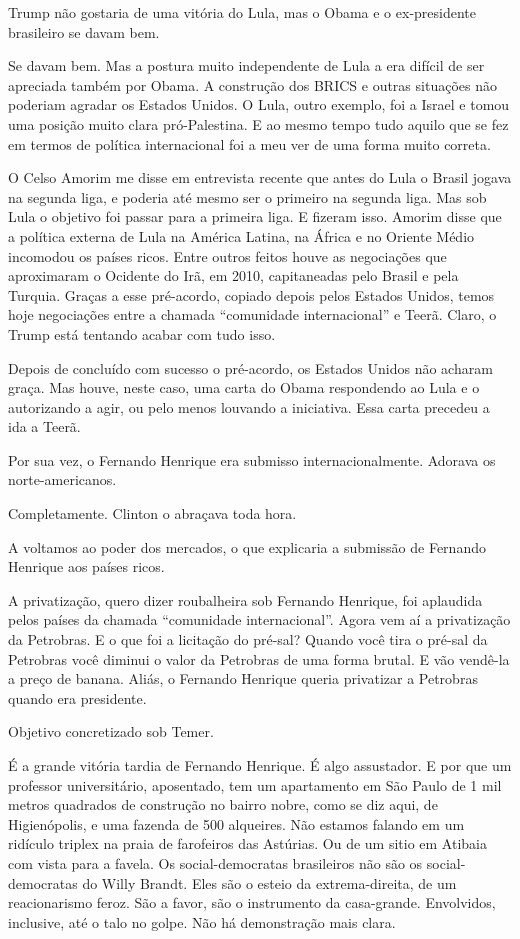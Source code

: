  Trump não gostaria de uma vitória do Lula, mas o Obama e o
ex-presidente brasileiro se davam bem.

 Se davam bem. Mas a postura muito independente de Lula a era difícil
de ser apreciada também por Obama. A construção dos BRICS e outras
situações não poderiam agradar os Estados Unidos. O Lula, outro exemplo,
foi a Israel e tomou uma posição muito clara pró-Palestina. E ao mesmo
tempo tudo aquilo que se fez em termos de política internacional foi a
meu ver de uma forma muito correta.

 O Celso Amorim me disse em entrevista recente que antes do Lula o
Brasil jogava na segunda liga, e poderia até mesmo ser o primeiro na
segunda liga. Mas sob Lula o objetivo foi passar para a primeira liga. E
fizeram isso. Amorim disse que a política externa de Lula na América
Latina, na África e no Oriente Médio incomodou os países ricos. Entre
outros feitos houve as negociações que aproximaram o Ocidente do Irã, em
2010, capitaneadas pelo Brasil e pela Turquia. Graças a esse pré-acordo,
copiado depois pelos Estados Unidos, temos hoje negociações entre a
chamada ``comunidade internacional'' e Teerã. Claro, o Trump está
tentando acabar com tudo isso.

 Depois de concluído com sucesso o pré-acordo, os Estados Unidos não
acharam graça. Mas houve, neste caso, uma carta do Obama respondendo ao
Lula e o autorizando a agir, ou pelo menos louvando a iniciativa. Essa
carta precedeu a ida a Teerã.

 Por sua vez, o Fernando Henrique era submisso internacionalmente.
Adorava os norte-americanos.

 Completamente. Clinton o abraçava toda hora.

 A voltamos ao poder dos mercados, o que explicaria a submissão de
Fernando Henrique aos países ricos.

 A privatização, quero dizer roubalheira sob Fernando Henrique, foi
aplaudida pelos países da chamada ``comunidade internacional''. Agora
vem aí a privatização da Petrobras. E o que foi a licitação do pré-sal?
Quando você tira o pré-sal da Petrobras você diminui o valor da
Petrobras de uma forma brutal. E vão vendê-la a preço de banana. Aliás,
o Fernando Henrique queria privatizar a Petrobras quando era presidente.

 Objetivo concretizado sob Temer.

 É a grande vitória tardia de Fernando Henrique. É algo assustador. E
por que um professor universitário, aposentado, tem um apartamento em
São Paulo de 1 mil metros quadrados de construção no bairro nobre, como
se diz aqui, de Higienópolis, e uma fazenda de 500 alqueires. Não
estamos falando em um ridículo triplex na praia de farofeiros das
Astúrias. Ou de um sitio em Atibaia com vista para a favela. Os
social-democratas brasileiros não são os social-democratas do Willy
Brandt. Eles são o esteio da extrema-direita, de um reacionarismo feroz.
São a favor, são o instrumento da casa-grande. Envolvidos, inclusive,
até o talo no golpe. Não há demonstração mais clara.


